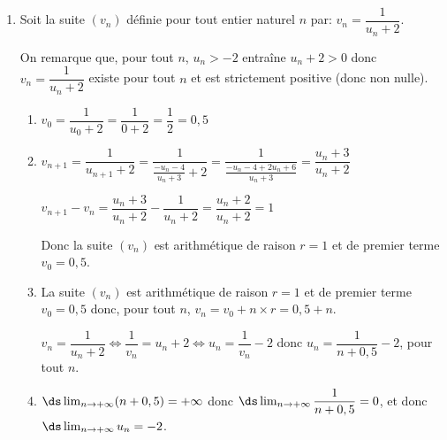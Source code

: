 \begin{enumerate}
\item Soit la suite $\left(v_n\right)$ définie pour tout entier naturel $n$ par: $v_n = \dfrac{1}{u_n + 2}$.

On remarque que, pour tout $n$, $u_n>-2$ entraîne $u_n+2>0$ donc $v_n = \dfrac{1}{u_n+2}$ existe pour tout $n$ et est strictement positive (donc non nulle).

	\begin{enumerate}
		\item $v_0 = \dfrac{1}{u_0+2} = \dfrac{1}{0+2} = \dfrac{1}{2}=0,5$
		
		\item %
$v_{n+1} = \dfrac{1}{u_{n+1}+2} 
= \dfrac{1}{\frac{-u_n-4}{u_n+3}+2}
= \dfrac{1}{\frac{-u_n-4 +2u_n+6}{u_n+3}}		
= \dfrac{u_n+3}{u_n+2}$

$v_{n+1}-v_n = \dfrac{u_n+3}{u_n+2} - \dfrac{1}{u_n+2}
=\dfrac{u_n+2}{u_n+2}=1$

Donc la suite $(v_n)$ est arithmétique de raison $r=1$ et de premier terme $v_0=0,5$.
			
		\item %
La suite $(v_n)$ est arithmétique de raison $r=1$ et de premier terme $v_0=0,5$ donc, pour tout $n$, $v_n=v_0+n\times r = 0,5 + n$.

$v_n=\dfrac{1}{u_n+2}
\iff
\dfrac{1}{v_n} = u_n+2
\iff
u_n=\dfrac{1}{v_n}-2$ donc $u_n=\dfrac{1}{n+0,5}-2$, pour tout $n$.

		\item %
$\ds\lim_{n\to +\infty} (n+0,5)=+\infty$ donc
$\ds\lim_{n\to +\infty} \dfrac{1}{n+0,5}=0$, et donc
$\ds\lim_{n\to +\infty} u_n=-2$.
	\end{enumerate}
\end{enumerate}

\bigskip

